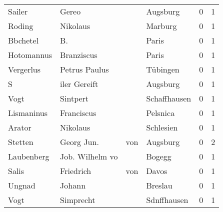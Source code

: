 \begin{center}
\begin{tiny}
\begin{longtabu}{llllrr}
                   Sailer &                              Gereo &             &                                    Augsburg &          0 &         1 \\
                   Roding &                           Nikolaus &             &                                     Marburg &          0 &         1 \\
                 Bbchetel &                                 B. &             &                                       Paris &          0 &         1 \\
               Hotomannus &                         Branziscus &             &                                       Paris &          0 &         1 \\
                Vergerlus &                      Petrus Paulus &             &                                    Tübingen &          0 &         1 \\
                        S &                       iler Gereift &             &                                    Augsburg &          0 &         1 \\
                     Vogt &                           Sintpert &             &                                Schaffhausen &          0 &         1 \\
               Lismaninus &                         Franciscus &             &                                    Pelsnica &          0 &         1 \\
                   Arator &                           Nikolaus &             &                                   Schlesien &          0 &         1 \\
                  Stetten &                        Georg  Jun. &         von &                                    Augsburg &          0 &         2 \\
               Laubenberg &                    Job. Wilhelm vo &             &                                      Bogegg &          0 &         1 \\
                    Salis &                          Friedrich &         von &                                       Davos &          0 &         1 \\
                   Ungnad &                             Johann &             &                                     Breslau &          0 &         1 \\
                     Vogt &                          Simprecht &             &                                 Sdnffhausen &          0 &         1 \\

\end{longtabu}
\end{tiny}
\end{center}
